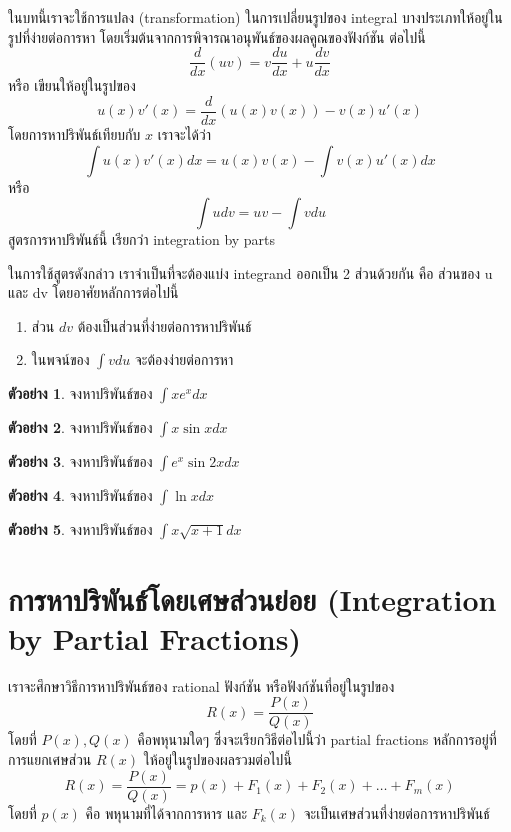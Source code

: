 \documentclass[
]{book}
\theoremstyle{definition}
\theoremstyle{definition}
\newtheorem{example}{ตัวอย่าง}[chapter]
\theoremstyle{definition}
\theoremstyle{definition}
\theoremstyle{remark}
\begin{document}
ในบทนี้เราจะใช้การแปลง (transformation) ในการเปลี่ยนรูปของ integral
บางประเภทให้อยู่ในรูปที่ง่ายต่อการหา โดยเริ่มต้นจากการพิจารณาอนุพันธ์ของผลคูณของฟังก์ชัน
ต่อไปนี้ \[\frac{d}{dx} (uv) = v\frac{du}{dx} + u\frac{dv}{dx}\] หรือ
เขียนให้อยู่ในรูปของ \[u(x) v'(x) = \frac{d}{dx}(u(x)v(x)) - v(x)u'(x)\]
โดยการหาปริพันธ์เทียบกับ \(x\) เราจะได้ว่า
\[\int u(x) v'(x) dx = u(x)v(x) -  \int v(x)u'(x)dx\] หรือ
\[\int u dv = uv -  \int v du\] สูตรการหาปริพันธ์นี้ เรียกว่า integration by
parts

ในการใช้สูตรดังกล่าว เราจำเป็นที่จะต้องแบ่ง integrand ออกเป็น 2 ส่วนด้วยกัน คือ ส่วนของ
u และ dv โดยอาศัยหลักการต่อไปนี้

\begin{enumerate}
\def\labelenumi{\arabic{enumi}.}
\item
  ส่วน \(dv\) ต้องเป็นส่วนที่ง่ายต่อการหาปริพันธ์
\item
  ในพจน์ของ \(\int v du\) จะต้องง่ายต่อการหา
\end{enumerate}

\begin{example}
จงหาปริพันธ์ของ \(\int x e^x dx\)
\end{example}

\begin{example}
จงหาปริพันธ์ของ \(\int x \sin x dx\)
\end{example}

\begin{example}
จงหาปริพันธ์ของ \(\int e^x \sin 2x dx\)
\end{example}

\begin{example}
จงหาปริพันธ์ของ \(\int \ln xdx\)
\end{example}

\begin{example}
จงหาปริพันธ์ของ \(\int x \sqrt{x+1}dx\)
\end{example}

\section{การหาปริพันธ์โดยเศษส่วนย่อย (Integration by Partial Fractions)}\label{uxe01uxe32uxe23uxe2buxe32uxe1buxe23uxe1euxe19uxe18uxe42uxe14uxe22uxe40uxe28uxe29uxe2auxe27uxe19uxe22uxe2duxe22-integration-by-partial-fractions}

เราจะศึกษาวิธีการหาปริพันธ์ของ rational ฟังก์ชัน หรือฟังก์ชันที่อยู่ในรูปของ
\[R(x) = \frac{P(x)}{Q(x)}\] โดยที่ \(P(x),Q(x)\) คือพหุนามใดๆ
ซึ่งจะเรียกวิธีต่อไปนี้ว่า partial fractions หลักการอยู่ที่การแยกเศษส่วน \(R(x)\)
ให้อยู่ในรูปของผลรวมต่อไปนี้ \[\label{partial-frac}
       R(x) = \frac{P(x)}{Q(x)} = p(x) + F_1(x) + F_2(x) + \ldots + F_m(x)\]
โดยที่ \(p(x)\) คือ พหุนามที่ได้จากการหาร และ \(F_k(x)\)
จะเป็นเศษส่วนที่ง่ายต่อการหาปริพันธ์
\end{document}
